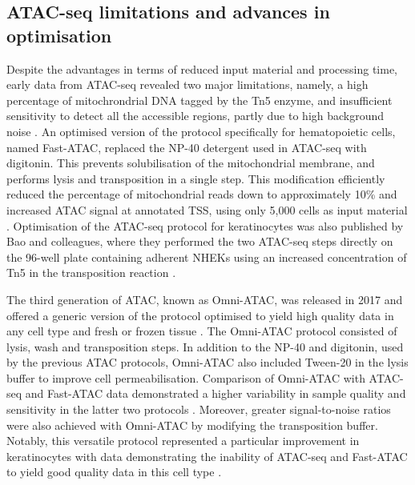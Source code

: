 \subsection{ATAC-seq limitations and advances in optimisation}  
Despite the advantages in terms of reduced input material and processing time, early data from ATAC-seq revealed two major limitations, namely, a high percentage of mitochrondrial DNA tagged by the Tn5 enzyme, and insufficient sensitivity to detect all the accessible regions, partly due to high background noise \parencite{Corces2016, Sos2016}. An optimised version of the protocol specifically for hematopoietic cells, named Fast-ATAC, replaced the NP-40 detergent used in ATAC-seq with digitonin. This prevents solubilisation of the mitochondrial membrane, and performs lysis and transposition in a single step. This modification efficiently reduced the percentage of mitochondrial reads down to approximately 10\% and increased ATAC signal at annotated TSS, using only 5,000 cells as input material \parencite{Corces2016}. Optimisation of the ATAC-seq protocol for keratinocytes was also published by Bao and colleagues, where they performed the two ATAC-seq steps directly on the 96-well plate containing adherent NHEKs using an increased concentration of Tn5 in the transposition reaction \parencite{Bao2015}.


The third generation of ATAC, known as Omni-ATAC, was released in 2017 and offered a generic version of the protocol optimised to yield high quality data in any cell type and fresh or frozen tissue \parencite{Corces2017}. The Omni-ATAC protocol consisted of lysis, wash and transposition steps. In addition to the NP-40 and digitonin, used by the previous ATAC protocols, Omni-ATAC also included Tween-20 in the lysis buffer to improve cell permeabilisation. Comparison of Omni-ATAC with ATAC-seq and Fast-ATAC data demonstrated a higher variability in sample quality and sensitivity in the latter two protocols \parencite{Corces2017}. Moreover, greater signal-to-noise ratios were also achieved with Omni-ATAC by modifying the transposition buffer. Notably, this versatile protocol represented a particular improvement in keratinocytes with data demonstrating the inability of ATAC-seq and Fast-ATAC to yield good quality data in this cell type \parencite{Corces2017}.  



